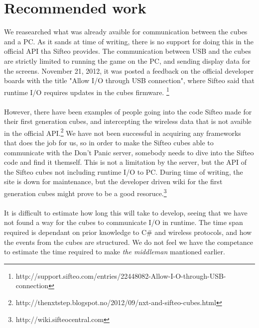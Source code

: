 

\section{Recommended work}

We reasearched what was already avaible for communication between the cubes and a PC. As it sands at time of writing, there is no support for doing this in the official API tha Sifteo provides. The communication between USB and the cubes are strictly limited to running the game on the PC, and sending display data for the screens. November 21, 2012, it was posted a feedback on the official developer boards with the title "Allow I/O through USB connection", where Sifteo said that runtime I/O requires updates in the cubes firmware.
\footnote{http://support.sifteo.com/entries/22448082-Allow-I-O-through-USB-connection}\\
\\
However, there have been examples of people going into the code Sifteo made for their first generation cubes, and intercepting the wireless data that is not avaible in the official API.\footnote{http://thenxtstep.blogspot.no/2012/09/nxt-and-sifteo-cubes.html} 
We have not been successful in acquiring any frameworks that does the job for us, so in order to make the Sifteo cubes able to communicate with the Don't Panic server, somebody needs to dive into the Sifteo code and find it themself. This is not a limitation by the server, but the API of the Sifteo cubes not including runtime I/O to PC. During time of writing, the site is down for maintenance, but the developer driven wiki for the first generation cubes might prove to be a good resoruce.\footnote{http://wiki.sifteocentral.com}\\
\\
It is difficult to estimate how long this will take to develop, seeing that we have not found a way for the cubes to communicate I/O in runtime. The time span required is dependant on prior knowledge to C\# and wireless protocols, and how the events from the cubes are structured. We do not feel we have the competance to estimate the time required to make \emph{the middleman} mantioned earlier.

